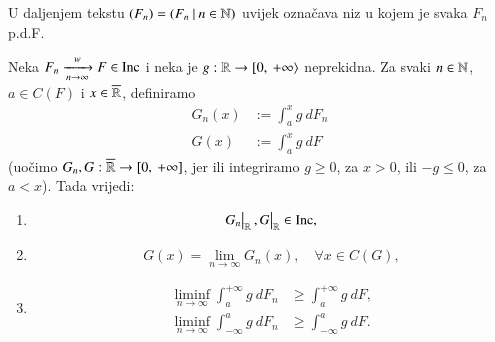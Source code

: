 U daljenjem tekstu $(F_n) = ({F_n} \: | \: {n \in \mathbb{N}})$ uvijek ozna\v cava niz u kojem je svaka $F_n$ p.d.F.

\begin{lm}  \label{lm:16.9}
    Neka $F_n \xrightarrow[n \to \infty]{w} F \in \mathrm{Inc}$ i neka je $g: \mathbb{R} \to [ {0}, \: {+\infty} \rangle$ neprekidna.
    Za svaki $n \in \mathbb{N}$, $a \in C(F)$ i $x \in \overline{\mathbb{R}}$, definiramo
    \begin{equation*}
        \begin{aligned}
            G_n (x) &:= \int_a^x g \: d F_n\\
            G(x) &:= \int_a^x g \: d F
        \end{aligned}
    \end{equation*}
    (uo\v cimo $G_n, G : \overline{\mathbb{R}} \to [{0}, \:{+\infty}]$, jer ili integriramo $g \geq 0$, za $x > 0$, ili $-g \leq 0$, za $a < x$).
    Tada vrijedi:
    \begin{enumerate}[label=(\roman*)]
        \item \label{lm:16.9.1}
        \begin{equation*}
            \restr{G_n}{\real}, \restr{G}{\real} \in \inc,
        \end{equation*}
        \item \label{lm:16.9.2}
        \begin{equation*}
            G (x) = \lim_{n \to \infty} G_n(x), \quad \forall x \in C(G),
        \end{equation*}
        \item \label{lm:16.9.3}
        \begin{equation*}
            \begin{aligned}
                \liminf\limits_{n \to \infty} \int_a^{+\infty} g \: d F_n &\geq \int_a^{+\infty} g \: d F,\\
                \liminf\limits_{n \to \infty} \int_{-\infty}^a g \: d F_n &\geq \int_{-\infty}^a g \: d F.
            \end{aligned}
        \end{equation*}
    \end{enumerate}
\end{lm}